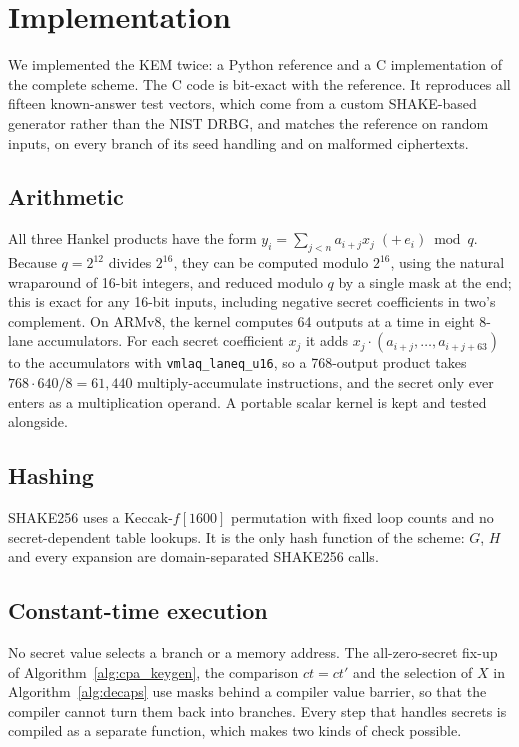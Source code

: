 \documentclass[11pt,a4paper]{article}
\theoremstyle{definition}
\begin{document}
\section{Implementation}\label{sec:impl}

We implemented the KEM twice: a Python reference and a C implementation of the complete scheme. The C code is bit-exact with the reference. It reproduces all fifteen known-answer test vectors, which come from a custom SHAKE-based generator rather than the NIST DRBG, and matches the reference on random inputs, on every branch of its seed handling and on malformed ciphertexts.

\subsection{Arithmetic}
All three Hankel products have the form $y_i = \sum_{j<n} a_{i+j} x_j \;(+\, e_i) \bmod q$. Because $q = 2^{12}$ divides $2^{16}$, they can be computed modulo $2^{16}$, using the natural wraparound of 16-bit integers, and reduced modulo $q$ by a single mask at the end; this is exact for any 16-bit inputs, including negative secret coefficients in two's complement. On ARMv8, the kernel computes 64 outputs at a time in eight 8-lane accumulators. For each secret coefficient $x_j$ it adds $x_j \cdot (a_{i+j}, \dots, a_{i+j+63})$ to the accumulators with \texttt{vmlaq\_laneq\_u16}, so a 768-output product takes $768 \cdot 640 / 8 = 61{,}440$ multiply-accumulate instructions, and the secret only ever enters as a multiplication operand. A portable scalar kernel is kept and tested alongside.

\subsection{Hashing}
SHAKE256 uses a Keccak-$f[1600]$ permutation with fixed loop counts and no secret-dependent table lookups. It is the only hash function of the scheme: $G$, $H$ and every expansion are domain-separated SHAKE256 calls.

\subsection{Constant-time execution}
No secret value selects a branch or a memory address. The all-zero-secret fix-up of Algorithm~\ref{alg:cpa_keygen}, the comparison $\mathit{ct} = \mathit{ct}'$ and the selection of $X$ in Algorithm~\ref{alg:decaps} use masks behind a compiler value barrier, so that the compiler cannot turn them back into branches. Every step that handles secrets is compiled as a separate function, which makes two kinds of check possible.
\end{document}
